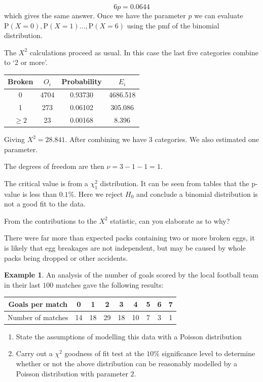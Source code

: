 \documentclass[
]{book}
\theoremstyle{definition}
\theoremstyle{definition}
\newtheorem{example}{Example}[chapter]
\theoremstyle{definition}
\theoremstyle{definition}
\theoremstyle{remark}
\begin{document}
\[6p=0.0644\]
which gives the same answer. Once we have the parameter \(p\) we can evaluate \(\text{P}(X=0),\text{P}(X=1)\ldots ,\text{P}(X=6)\) using the pmf of the binomial distribution.

The \(X^2\) calculations proceed as usual. In this case the last five categories combine to `2 or more'.

\begin{longtable}[]{@{}cccc@{}}
\toprule
Broken & \(O_i\) & Probability & \(E_i\)\tabularnewline
\midrule
\endhead
0 & 4704 & 0.93730 & 4686.518\tabularnewline
1 & 273 & 0.06102 & 305.086\tabularnewline
\(\geq 2\) & 23 & 0.00168 & 8.396\tabularnewline
\bottomrule
\end{longtable}

Giving \(X^2 = 28.841\).
After combining we have \(3\) categories. We also estimated one parameter.

The degrees of freedom are then \(\nu = 3-1-1 = 1\).

The critical value is from a \(\chi^2_1\) distribution. It can be seen from tables that the p-value is less than \(0.1\%\). Here we reject \(H_0\) and conclude a binomial distribution is not a good fit to the data.

From the contributions to the \(X^2\) statistic, can you elaborate as to why?

There were far more than expected packs containing two or more broken eggs, it is likely that egg breakages are not independent, but may be caused by whole packs being dropped or other accidents.

\begin{example}

An analysis of the number of goals scored by the local football team in their last \(100\) matches gave the following results:

\begin{longtable}[]{@{}ccccccccc@{}}
\toprule
Goals per match & 0 & 1 & 2 & 3 & 4 & 5 & 6 & 7\tabularnewline
\midrule
\endhead
Number of matches & 14 & 18 & 29 & 18 & 10 & 7 & 3 & 1\tabularnewline
\bottomrule
\end{longtable}

\begin{enumerate}
\def\labelenumi{\alph{enumi})}
\item
  State the assumptions of modelling this data with a Poisson distribution
\item
  Carry out a \(\chi^2\) goodness of fit test at the \(10\%\) significance level to determine whether or not the above distribution can be reasonably modelled by a Poisson distribution with parameter \(2\).
\end{enumerate}

\end{example}
\end{document}
